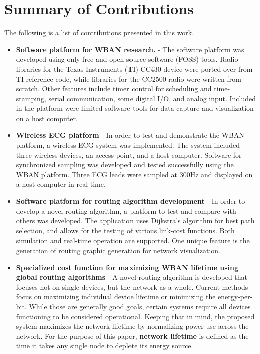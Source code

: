 \documentclass{article}
\begin{document}
\section{Summary of Contributions}
The following is a list of contributions presented in this work.
\begin{itemize}
\item \textbf{Software platform for WBAN research.} - The software platform was developed using only free and open source software (FOSS) tools. Radio libraries for the Texas Instruments (TI) CC430 device were ported over from TI reference code, while libraries for the CC2500 radio were written from scratch. Other features include timer control for scheduling and time-stamping, serial communication, some digital I/O, and analog input. Included in the platform were limited software tools for data capture and visualization on a host computer.

\item \textbf{Wireless ECG platform} - In order to test and demonstrate the WBAN platform, a wireless ECG system was implemented. The system included three wireless devices, an access point, and a host computer. Software for synchronized sampling was developed and tested successfully using the WBAN platform. Three ECG leads were sampled at 300Hz and displayed on a host computer in real-time.

\item \textbf{Software platform for routing algorithm development} - In order to develop a novel routing algorithm, a platform to test and compare with others was developed. The application uses Dijkstra's algorithm for best path selection, and allows for the testing of various link-cost functions. Both simulation and real-time operation are supported. One unique feature is the generation of routing graphic generation for network visualization.

\item \textbf{Specialized cost function for maximizing WBAN lifetime using global routing algorithms} - A novel routing algorithm is developed that focuses not on single devices, but the network as a whole. Current methods focus on maximizing individual device lifetime or minimizing the energy-per-bit. While those are generally good goals, certain systems require all devices functioning to be considered operational. Keeping that in mind, the proposed system maximizes the network lifetime by normalizing power use across the network. For the purpose of this paper, \textbf{network lifetime} is defined as the time it takes any single node to deplete its energy source. 

\end{itemize}
\end{document}
